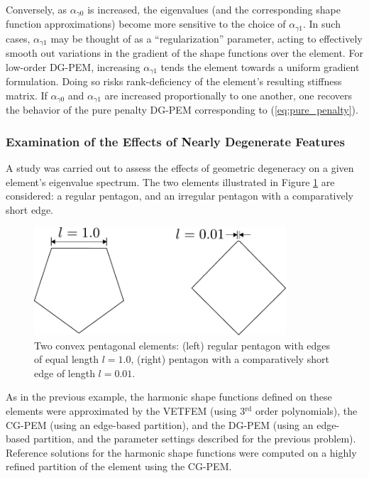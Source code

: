 Conversely, as $\alpha_{\gamma0}$ is increased, the eigenvalues (and the corresponding shape function approximations) become more sensitive to the choice of $\alpha_{\gamma1}$. In such cases, $\alpha_{\gamma1}$ may be thought of as a ``regularization'' parameter, acting to effectively smooth out variations in the gradient of the shape functions over the element. For low-order DG-PEM, increasing $\alpha_{\gamma1}$ tends the element towards a uniform gradient formulation. Doing so risks rank-deficiency of the element's resulting stiffness matrix. If $\alpha_{\gamma0}$ and $\alpha_{\gamma1}$ are increased proportionally to one another, one recovers the behavior of the pure penalty DG-PEM corresponding to (\ref{eq:pure_penalty}).

\subsubsection*{Examination of the Effects of Nearly Degenerate Features}

A study was carried out to assess the effects of geometric degeneracy on a given element's eigenvalue spectrum. The two elements illustrated in Figure \ref{fig:degenerate_element_shapes} are considered: a regular pentagon, and an irregular pentagon with a comparatively short edge.

\begin{figure}[!h]
  \centering
  \includegraphics[width=3.7in]{figures/degenerate_element_shapes.pdf}  \caption{Two convex pentagonal elements: (left) regular pentagon with edges of equal length $l = 1.0$, (right) pentagon with a comparatively short edge of length $l = 0.01$.}
  \label{fig:degenerate_element_shapes}
\end{figure}

As in the previous example, the harmonic shape functions defined on these elements were approximated by the VETFEM (using 3$^{\text{rd}}$ order polynomials), the CG-PEM (using an edge-based partition), and the DG-PEM (using an edge-based partition, and the parameter settings described for the previous problem). Reference solutions for the harmonic shape functions were computed on a highly refined partition of the element using the CG-PEM.

